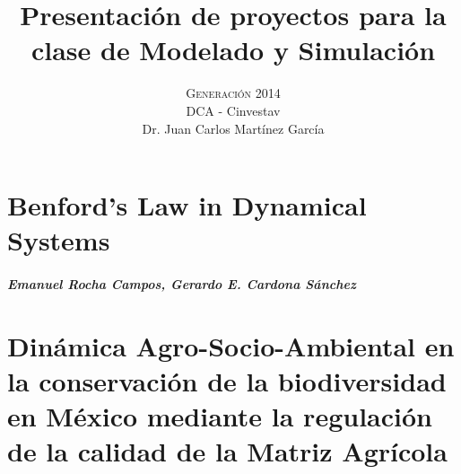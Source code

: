 



\title{\vspace{-15mm}\fontsize{24pt}{10pt}\selectfont\textbf{Presentación de proyectos para la clase de Modelado y Simulación}} %

\author{
\large \textsc{Generación 2014}\\[2mm] %
\normalsize DCA - Cinvestav \\ %
\normalsize Dr. Juan Carlos Martínez García %
\vspace{-5mm}
}
\date{}




    \maketitle %
    \thispagestyle{fancy} %


    \chapter{Benford's Law in Dynamical Systems}
    \paragraph{Emanuel Rocha Campos, Gerardo E. Cardona Sánchez}
    

    \chapter{Dinámica Agro-Socio-Ambiental en la conservación de la biodiversidad en México mediante la regulación de la calidad de la Matriz Agrícola}
